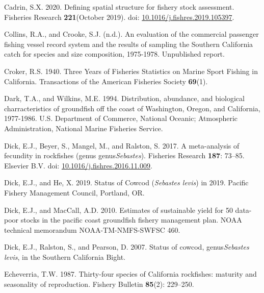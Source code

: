 \documentclass[11pt,
  english,
  a4paper,
]{article}
\newlength{\cslhangindent}
\newenvironment{CSLReferences}[2] %
 {%
  \setlength{\parindent}{0pt}
  \ifodd #1 \everypar{\setlength{\hangindent}{\cslhangindent}}\ignorespaces\fi
  \ifnum #2 > 0
  \setlength{\parskip}{#2\baselineskip}
  \fi
 }%
 {}
\begin{document}
\begin{CSLReferences}{1}{0}
\leavevmode{}%
Cadrin, S.X. 2020. {Defining spatial structure for fishery stock assessment}. Fisheries Research \textbf{221}(October 2019). doi: \href{https://doi.org/10.1016/j.fishres.2019.105397}{10.1016/j.fishres.2019.105397}.

\leavevmode{}%
Collins, R.A., and Crooke, S.J. (n.d.). {An evaluation of the commercial passenger fishing vessel record system and the results of sampling the Southern California catch for species and size composition, 1975-1978}. Unpublished report.

\leavevmode{}%
Croker, R.S. 1940. {Three Years of Fisheries Statistics on Marine Sport Fishing in California}. Transactions of the American Fisheries Society \textbf{69}(1).

\leavevmode{}%
Dark, T.A., and Wilkins, M.E. 1994. {Distribution, abundance, and biological charracteristics of groundfish off the coast of Washington, Oregon, and California, 1977-1986}. U.S. Department of Commerce, National Oceanic; Atmospheric Administration, National Marine Fisheries Service.

\leavevmode{}%
Dick, E.J., Beyer, S., Mangel, M., and Ralston, S. 2017. {A meta-analysis of fecundity in rockfishes (genus genus\emph{Sebastes})}. Fisheries Research \textbf{187}: 73--85. Elsevier B.V. doi: \href{https://doi.org/10.1016/j.fishres.2016.11.009}{10.1016/j.fishres.2016.11.009}.

\leavevmode{}%
Dick, E.J., and He, X. 2019. {Status of Cowcod (\emph{Sebastes levis}) in 2019}. Pacific Fishery Management Council, Portland, OR.

\leavevmode{}%
Dick, E.J., and MacCall, A.D. 2010. {Estimates of sustainable yield for 50 data-poor stocks in the pacific coast groundfish fishery management plan}. NOAA technical memorandum NOAA-TM-NMFS-SWFSC 460.

\leavevmode{}%
Dick, E.J., Ralston, S., and Pearson, D. 2007. {Status of cowcod, genus\emph{Sebastes levis}, in the Southern California Bight}.

\leavevmode{}%
Echeverria, T.W. 1987. {Thirty-four species of California rockfishes: maturity and seasonality of reproduction}. Fishery Bulletin \textbf{85}(2): 229--250.


\end{CSLReferences}
\end{document}
